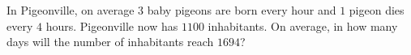 In Pigeonville, on average $3$ baby pigeons are born every hour and $1$ pigeon dies every $4$ hours. Pigeonville now has $1100$ inhabitants. On average, in how many days will the number of inhabitants reach $1694$?
